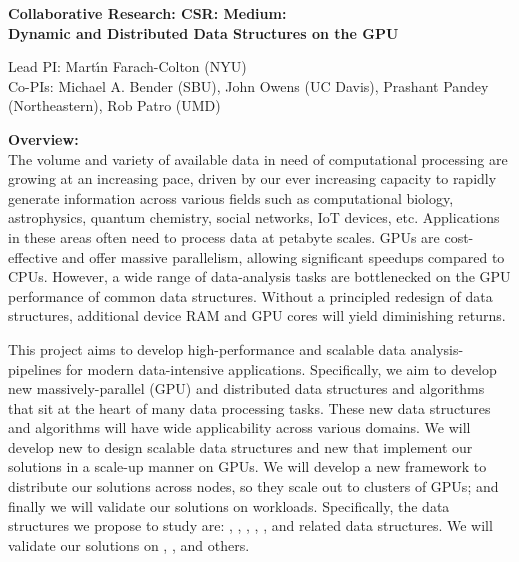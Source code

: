 
\begin{center}

\bf
\Large
Collaborative Research: CSR\@: Medium: \\Dynamic and Distributed Data Structures on the GPU

\small
Lead PI\@: Mart\'{\i}n Farach-Colton (NYU) \\
Co-PIs: Michael A. Bender (SBU), John Owens (UC Davis), Prashant Pandey (Northeastern), Rob Patro (UMD)
\end{center}

\vspace{-0.3cm}

\noindent \textbf{\large Overview:}\\
The volume and variety of available data in need of computational processing are growing at an increasing pace, driven by our ever increasing capacity to rapidly generate information across various fields such as  computational biology, astrophysics, quantum chemistry, social networks, IoT devices, etc. Applications in these areas often need to process data at petabyte scales. 
GPUs are cost-effective and offer massive parallelism, allowing significant speedups compared to CPUs. 
However, a wide range of data-analysis tasks are bottlenecked on the GPU performance of common data structures.  Without a principled redesign of data structures, additional device RAM and GPU cores will yield diminishing returns.

This project aims to develop high-performance and scalable data analysis-pipelines for modern data-intensive applications. Specifically, we aim to develop new massively-parallel (GPU) and distributed data structures and algorithms that sit at the heart of many data processing tasks. These new data structures and algorithms will have wide applicability across various domains.
%
We will develop new  to design scalable data structures and new  that implement our solutions in a scale-up manner on GPUs. We will develop a new framework to distribute our solutions across nodes, so they scale out to clusters of GPUs; and finally we will validate our solutions on  workloads.
%
Specifically, the data structures we propose to study are: , , , , , and related data structures. We will validate our solutions on , ,  and others.

